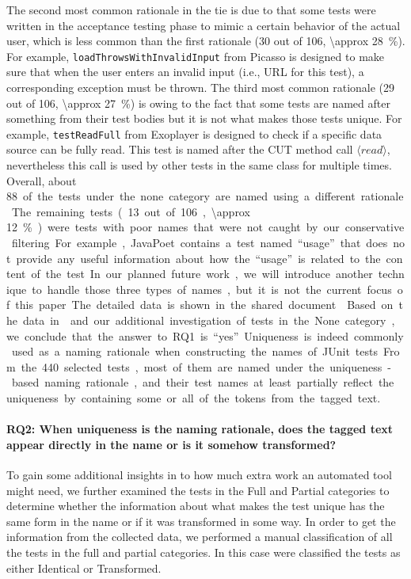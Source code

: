 The second most common rationale in the tie is due to that some tests were written in the acceptance testing phase to mimic a certain behavior of the actual user, which is less common than the first rationale (\num{30} out of \num{106}, \SI{\approx 28}{\percent}).
%
For example, \texttt{load\-Throws\-With\-Invalid\-Input} from Picasso is designed to make sure that when the user enters an invalid input (i.e., URL for this test), a corresponding exception must be thrown.
%
The third most common rationale (\num{29} out of \num{106}, \SI{\approx 27}{\percent}) is owing to the fact that some tests are named after something from their test bodies but it is not what makes those tests unique.
%
For example, \texttt{test\-Read\-Full} from Exoplayer is designed to check if a specific data source can be fully read. This test is named after the CUT method call $\langle read \rangle$, nevertheless this call is used by other tests in the same class for multiple times.
%
Overall, about \SI{88} of the tests under the none category are named using a different rationale. 
%
The remaining tests (\num{13} out of \num{106}, \SI{\approx 12}{\percent}) were tests with poor names that were not caught by our conservative filtering.
%
For example, JavaPoet contains a test named \enquote{usage} that does not provide any useful information about how the \enquote{usage} is related to the content of the test.
%
In our planned future work, we will introduce another technique to handle those three types of names, but it is not the current focus of this paper.
%
The detailed data is shown in the shared document~\cite{emp-data}.


Based on the data in~ and our additional investigation of tests in the None category, we conclude that the answer to RQ1 is \enquote{yes}.
%
Uniqueness is indeed commonly used as a naming rationale when constructing the names of JUnit tests.
%
From the \num{440} selected tests, most of them are named under the uniqueness-based naming rationale, and their test names at least partially reflect the uniqueness by containing some or all of the tokens from the tagged text.


\paragraph{RQ2: When uniqueness is the naming rationale, does the tagged text appear directly in the name or is it somehow transformed?}

To gain some additional insights in to how much extra work an automated tool might need, we further examined the tests in the Full and Partial categories to determine whether the information about what makes the test unique has the same form in the name or if it was transformed in some way.
%
In order to get the information from the collected data, we performed a manual classification of all the tests in the full and partial categories.
%
In this case were classified the tests as either Identical or Transformed.

